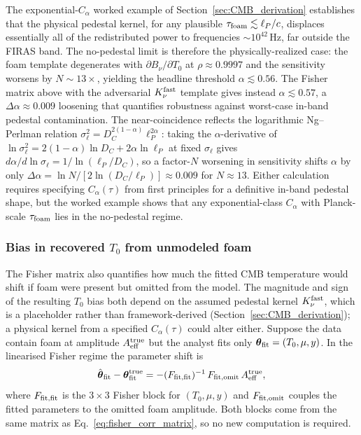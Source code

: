 \documentclass[aps,prd,onecolumn,amsmath,amssymb]{revtex4-2}
\begin{document}
The exponential-$C_\alpha$ worked example of
Section~\ref{sec:CMB_derivation} establishes that the physical
pedestal kernel, for any plausible
$\tau_{\rm foam}\lesssim\ell_P/c$, displaces essentially all of the
redistributed power to frequencies $\sim 10^{42}$\,Hz, far outside
the FIRAS band.  The no-pedestal limit is therefore the
physically-realized case: the foam template degenerates with
$\partial B_\nu/\partial T_0$ at $\rho\approx 0.9997$ and the
sensitivity worsens by $N\sim 13\times$, yielding the headline
threshold $\alpha\lesssim 0.56$.  The Fisher matrix above with the
adversarial $K_\nu^{\rm fast}$ template gives instead
$\alpha\lesssim 0.57$, a $\Delta\alpha\approx 0.009$ loosening that
quantifies robustness against worst-case in-band pedestal
contamination.  The near-coincidence reflects the logarithmic
Ng--Perlman relation $\sigma_\ell^2 = D_C^{2(1-\alpha)}\ell_P^{2\alpha}$:
taking the $\alpha$-derivative of
$\ln\sigma_\ell^2 = 2(1-\alpha)\ln D_C + 2\alpha\ln\ell_P$ at fixed
$\sigma_\ell$ gives $d\alpha/d\ln\sigma_\ell = 1/\ln(\ell_P/D_C)$,
so a factor-$N$ worsening in sensitivity shifts $\alpha$ by only
$\Delta\alpha=\ln N/[2\ln(D_C/\ell_P)]\approx 0.009$ for $N\approx 13$.
Either calculation requires specifying $C_\alpha(\tau)$ from first
principles for a definitive in-band pedestal shape, but the worked
example shows that any exponential-class $C_\alpha$ with
Planck-scale $\tau_{\rm foam}$ lies in the no-pedestal regime.

\subsubsection{Bias in recovered $T_0$ from unmodeled foam}
\label{sec:CMB_T0_bias}

The Fisher matrix also quantifies how much the fitted CMB temperature
would shift if foam were present but omitted from the model.  The
magnitude and sign of the resulting $T_0$ bias both depend on the
assumed pedestal kernel $K_\nu^{\rm fast}$, which is a placeholder
rather than framework-derived (Section~\ref{sec:CMB_derivation}); a
physical kernel from a specified $C_\alpha(\tau)$ could alter either.
Suppose
the data contain foam at amplitude $A_{\rm eff}^{\rm true}$ but the
analyst fits only $\boldsymbol{\theta}_{\rm fit}=(T_0,\mu,y)$.  In the
linearised Fisher regime the parameter shift is
\begin{equation}
  \hat{\boldsymbol{\theta}}_{\rm fit}
    - \boldsymbol{\theta}_{\rm fit}^{\rm true}
  = -(F_{\rm fit,fit})^{-1}\,F_{\rm fit,omit}\,A_{\rm eff}^{\rm true},
  \label{eq:bias_formula}
\end{equation}
where $F_{\rm fit,fit}$ is the $3\times3$ Fisher block for
$(T_0,\mu,y)$ and $F_{\rm fit,omit}$ couples the fitted parameters to
the omitted foam amplitude.  Both blocks come from the same matrix as
Eq.~\eqref{eq:fisher_corr_matrix}, so no new computation is required.
\end{document}
